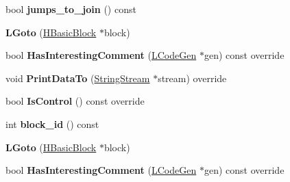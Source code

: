 \begin{DoxyCompactItemize}
\item 
bool {\bfseries jumps\+\_\+to\+\_\+join} () const \hypertarget{classv8_1_1internal_1_1_l_goto_ad20f4da1f305aa9b9c7f33355bb7203f}{}\label{classv8_1_1internal_1_1_l_goto_ad20f4da1f305aa9b9c7f33355bb7203f}

\item 
{\bfseries L\+Goto} (\hyperlink{classv8_1_1internal_1_1_h_basic_block}{H\+Basic\+Block} $\ast$block)\hypertarget{classv8_1_1internal_1_1_l_goto_a508956b700f4a115d2ae81e5c81b6d52}{}\label{classv8_1_1internal_1_1_l_goto_a508956b700f4a115d2ae81e5c81b6d52}

\item 
bool {\bfseries Has\+Interesting\+Comment} (\hyperlink{classv8_1_1internal_1_1_l_code_gen}{L\+Code\+Gen} $\ast$gen) const  override\hypertarget{classv8_1_1internal_1_1_l_goto_ae2dcadae50f2f182e7f9d772a170fe7b}{}\label{classv8_1_1internal_1_1_l_goto_ae2dcadae50f2f182e7f9d772a170fe7b}

\item 
void {\bfseries Print\+Data\+To} (\hyperlink{classv8_1_1internal_1_1_string_stream}{String\+Stream} $\ast$stream) override\hypertarget{classv8_1_1internal_1_1_l_goto_a42fa9224cfb4df48322ebdcf082ab6db}{}\label{classv8_1_1internal_1_1_l_goto_a42fa9224cfb4df48322ebdcf082ab6db}

\item 
bool {\bfseries Is\+Control} () const  override\hypertarget{classv8_1_1internal_1_1_l_goto_a4d45f583f9f81949e0ec9ab82d0a4dd1}{}\label{classv8_1_1internal_1_1_l_goto_a4d45f583f9f81949e0ec9ab82d0a4dd1}

\item 
int {\bfseries block\+\_\+id} () const \hypertarget{classv8_1_1internal_1_1_l_goto_a232c7b24fbe5cb48aa50908fe3d26626}{}\label{classv8_1_1internal_1_1_l_goto_a232c7b24fbe5cb48aa50908fe3d26626}

\item 
{\bfseries L\+Goto} (\hyperlink{classv8_1_1internal_1_1_h_basic_block}{H\+Basic\+Block} $\ast$block)\hypertarget{classv8_1_1internal_1_1_l_goto_a508956b700f4a115d2ae81e5c81b6d52}{}\label{classv8_1_1internal_1_1_l_goto_a508956b700f4a115d2ae81e5c81b6d52}

\item 
bool {\bfseries Has\+Interesting\+Comment} (\hyperlink{classv8_1_1internal_1_1_l_code_gen}{L\+Code\+Gen} $\ast$gen) const  override\hypertarget{classv8_1_1internal_1_1_l_goto_ae2dcadae50f2f182e7f9d772a170fe7b}{}\label{classv8_1_1internal_1_1_l_goto_ae2dcadae50f2f182e7f9d772a170fe7b}


\end{DoxyCompactItemize}
